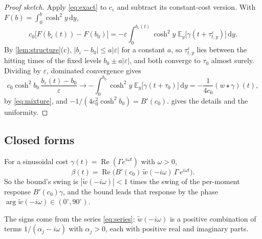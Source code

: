 \documentclass[11pt]{article}
\theoremstyle{definition}
\theoremstyle{remark}
\newcommand{\E}{\mathbb{E}}
\newcommand{\dd}{\,\mathrm{d}}
\begin{document}
\begin{proof}[Proof sketch]
Apply \eqref{eq:exact} to $c_\varepsilon$ and subtract its constant-cost version. With
$F(b) = \int_0^b \cosh^2 y\dd y$,
\begin{equation}
  c_0\bigl[F(b_\varepsilon(t)) - F(b_0)\bigr]
  = -\varepsilon\int_0^{b_\varepsilon(t)} \cosh^2 y\;\E_y\bigl[\gamma(t + \tau^\varepsilon_{t,y})\bigr]\dd y.
\end{equation}
By \cref{lem:structure}(c), $|b_\varepsilon - b_0| \le a|\varepsilon|$ for a constant $a$, so
$\tau^\varepsilon_{t,y}$ lies between the hitting times of the fixed levels $b_0 \pm a|\varepsilon|$,
and both converge to $\tau_0$ almost surely. Dividing by $\varepsilon$, dominated convergence gives
\begin{equation}
  c_0\cosh^2 b_0\,\frac{b_\varepsilon(t) - b_0}{\varepsilon} \to
  -\int_0^{b_0}\cosh^2 y\;\E_y\bigl[\gamma(t + \tau_0)\bigr]\dd y
  = -\frac{1}{4c_0}(w \star \gamma)(t),
\end{equation}
by \eqref{eq:mixture}, and $-1/(4c_0^2\cosh^2 b_0) = B'(c_0)$.  gives the details
and the uniformity.
\end{proof}

\subsection{Closed forms}

\begin{corollary}
\label{cor:transfer}
For a sinusoidal cost $\gamma(t) = \operatorname{Re}(\Gamma e^{i\omega t})$ with $\omega > 0$,
\begin{equation}
  \beta(t) = \operatorname{Re}\bigl(B'(c_0)\,\tilde w(-i\omega)\,\Gamma\,e^{i\omega t}\bigr).
\end{equation}
So the bound's swing is $|\tilde w(-i\omega)| < 1$ times the swing of the per-moment response
$B'(c_0)\gamma$, and the bound leads that response by the phase $\arg\tilde w(-i\omega) \in
(0^\circ, 90^\circ)$.
\end{corollary}

The signs come from the series \eqref{eq:series}: $\tilde w(-i\omega)$ is a positive combination
of terms $1/(\alpha_j - i\omega)$ with $\alpha_j > 0$, each with positive real and imaginary
parts.
\end{document}
